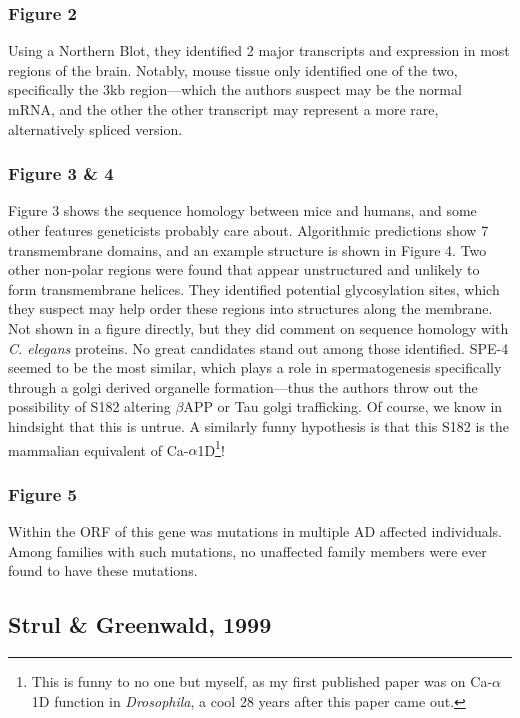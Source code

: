 \documentclass[12pt]{report}
\newcommand{\be}{\beta}
\begin{document}
\subsubsection*{Figure 2}

Using a Northern Blot, they identified 2 major transcripts and expression in most regions of the brain. Notably, mouse tissue only identified one of the two, specifically the 3kb region---which the authors suspect may be the normal mRNA, and the other the other transcript may represent a more rare, alternatively spliced version. 

\subsubsection*{Figure 3 \& 4}

Figure 3 shows the sequence homology between mice and humans, and some other features geneticists probably care about. Algorithmic predictions show 7 transmembrane domains, and an example structure is shown in Figure 4. Two other non-polar regions were found that appear unstructured and unlikely to form transmembrane helices. They identified potential glycosylation sites, which they suspect may help order these regions into structures along the membrane. Not shown in a figure directly, but they did comment on sequence homology with \textit{C. elegans} proteins. No great candidates stand out among those identified. SPE-4 seemed to be the most similar, which plays a role in spermatogenesis specifically through a golgi derived organelle formation---thus the authors throw out the possibility of S182 altering $\be$APP or Tau golgi trafficking. Of course, we know in hindsight that this is untrue. A similarly funny hypothesis is that this S182 is the mammalian equivalent of Ca-$\alpha$1D\footnote{This is funny to no one but myself, as my first published paper was on Ca-$\alpha$1D function in \textit{Drosophila}, a cool 28 years after this paper came out.}! 

\subsubsection*{Figure 5}

Within the ORF of this gene was mutations in multiple AD affected individuals. Among families with such mutations, no unaffected family members were ever found to have these mutations. 

\subsection*{Strul \& Greenwald, 1999}
\end{document}
